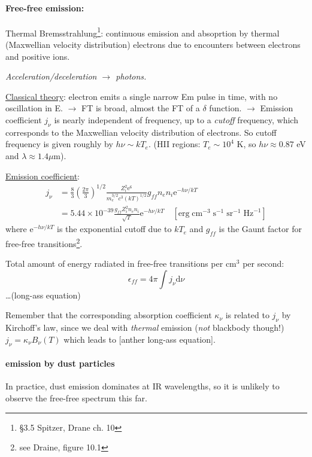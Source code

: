 \documentclass[11pt]{article}
\newcommand{\mar}[1]{\hspace{0pt}\marginpar{-\textcolor{black}{#1}-}}
\newcommand{\mynotes}[1]{{\fontfamily{cmss}\selectfont \textit{#1}}}
\begin{document}
\paragraph{Free-free emission:}
Thermal Bremsstrahlung\footnote{
    \S{3.5} Spitzer, Drane ch. 10}:
continuous emission and absoprtion by thermal (Maxwellian velocity
distribution) electrons due to encounters between electrons and positive ions.

\mynotes{Acceleration/deceleration $\longrightarrow$ photons.}

\underline{Classical theory}: electron emits a single narrow Em pulse in time,
with no oscillation in E. $\rightarrow$ FT is broad, almost the FT of a
$\delta$ function. $\rightarrow$ Emission coefficient $j_{\nu}$ is nearly
independent of frequency, up to a \emph{cutoff} frequency, which corresponds to
the Maxwellian velocity distribution of electrons.
\mar{64}So cutoff frequency
is given roughly by $h\nu \sim kT_{e}$. (HII regions: $T_{e} \sim 10^{4}$ K, so
$h\nu \approx 0.87$ eV and $\lambda \approx 1.4 \mu$m).

\underline{Emission coefficient}:
\begin{align*}
    j_{\nu} &= \frac{8}{3}\left(\frac{2\pi}{3}\right)^{1/2}
    \frac{Z_{i}^{2}\mathrm{e}^{6}}{m_{e}^{3/2}c^{3}(kT)^{1/2}}
    g_{ff}n_{e}n_{i}\mathrm{e}^{-h\nu/kT}\\
    &= 5.44\times10^{-39}\frac{g_{ff}Z_{i}^{2}n_{e}n_{i}}{\sqrt{T}}
    \mathrm{e}^{-h\nu/kT}\quad
    [\mathrm{erg}\;\mathrm{cm}^{-3}\;\mathrm{s}^{-1}\;\mathrm{sr}^{-1}\;\mathrm{Hz}^{-1}]
\end{align*}
where $\mathrm{e}^{-h\nu/kT}$ is the exponential cutoff due to $kT_{e}$
and $g_{ff}$ is the Gaunt factor for free-free transitions\footnote{see
Draine, figure 10.1}.

Total amount of energy radiated in free-free transitions per cm$^{3}$
per second:
$${
    \epsilon_{ff} = 4\pi\int{j_{\nu}\mathrm{d}\nu}
}$$
\ldots (long-ass equation)

Remember that the corresponding absorption coefficient $\kappa_{\nu}$ is
related to $j_{\nu}$ by Kirchoff's law, since we deal with \emph{thermal}
emission (\emph{not} blackbody though!) $j_{\nu} = \kappa_{\nu}B_{\nu}(T)$
which leads to [anther long-ass equation].

\paragraph{emission by dust particles}
In practice, dust emission dominates at IR wavelengths, so it is
unlikely to observe the free-free spectrum this far.
\end{document}
